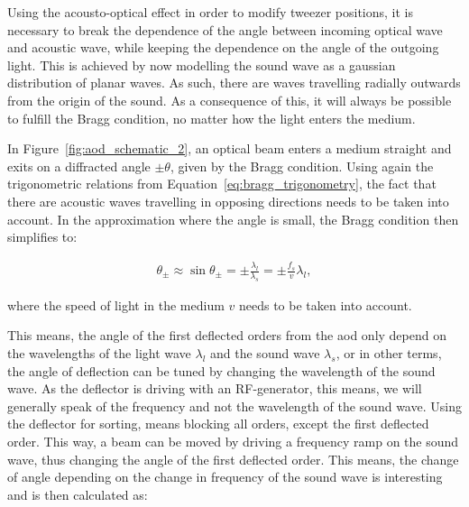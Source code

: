 
Using the acousto-optical effect in order to modify tweezer positions, it is necessary to break the dependence of the angle between incoming optical wave and acoustic wave, while keeping the dependence on the angle of the outgoing light. This is achieved by now modelling the sound wave as a gaussian distribution of planar waves. As such, there are waves travelling radially outwards from the origin of the sound. As a consequence of this, it will always be possible to fulfill the Bragg condition, no matter how the light enters the medium.

In Figure~\ref{fig:aod_schematic_2}, an optical beam enters a medium straight and exits on a diffracted angle $\pm \theta$, given by the Bragg condition. Using again the trigonometric relations from Equation~\ref{eq:bragg_trigonometry}, the fact that there are acoustic waves travelling in opposing directions needs to be taken into account. In the approximation where the angle is small, the Bragg condition then simplifies to:

\begin{figure}[t]
\end{figure}

\begin{align}
	\theta_\pm \approx \sin \theta_\pm = \pm \frac{\lambda_l}{\lambda_s} = \pm \frac{f_s}{v} \lambda_l,
\end{align}

where the speed of light in the medium $v$ needs to be taken into account.

This means, the angle of the first deflected orders from the \ac{aod} only depend on the wavelengths of the light wave $\lambda_l$ and the sound wave $\lambda_s$, or in other terms, the angle of deflection can be tuned by changing the wavelength of the sound wave. As the deflector is driving with an RF-generator, this means, we will generally speak of the frequency and not the wavelength of the sound wave. Using the deflector for sorting, means blocking all orders, except the first deflected order.
This way, a beam can be moved by driving a frequency ramp on the sound wave, thus changing the angle of the first deflected order. This means, the change of angle depending on the change in frequency of the sound wave is interesting and is then calculated as:

